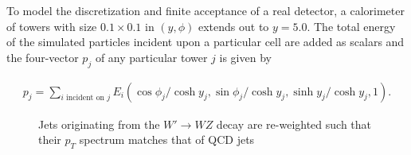 To model the discretization and finite acceptance of a real detector, a calorimeter of towers with size $0.1\times 0.1$ in $(y,\phi)$ extends out to $y=5.0$.  The total energy of the simulated particles incident upon a particular cell are added as scalars and the four-vector $p_j$ of any particular tower $j$ is given by

\begin{align}
\label{eq:calo}
p_j = \sum_{i\text{ incident on $j$}}E_i(\cos\phi_j/\cosh y_j,\sin\phi_j/\cosh y_j,\sinh y_j/\cosh y_j,1).
\end{align}


\begin{figure}[bt]
  \begin{center}
      \caption{ Jets originating from the $W'\rightarrow WZ$ decay are re-weighted such that their $p_T$ spectrum matches that of QCD jets\label{fig:pt} }
    \end{center}
\end{figure}


